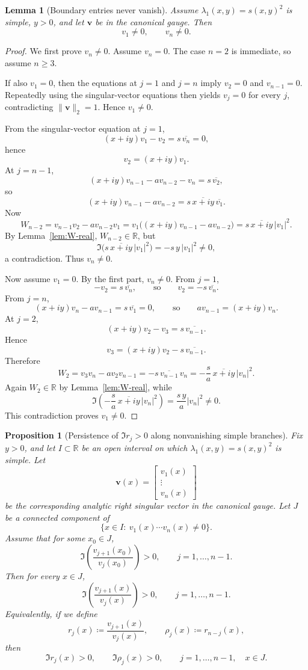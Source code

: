 \documentclass[11pt]{article}
\newtheorem{lemma}[theorem]{Lemma}
\newtheorem{proposition}[theorem]{Proposition}
\begin{document}
\begin{lemma}[Boundary entries never vanish]\label{lem:boundary-entries-nonzero}
Assume \(\lambda_1(x,y)=s(x,y)^2\) is simple, \(y>0\), and let \(\mathbf v\) be in the canonical gauge. Then
\[
v_1\neq 0,
\qquad
v_n\neq 0.
\]
\end{lemma}

\begin{proof}
We first prove \(v_n\neq 0\). Assume \(v_n=0\). The case \(n=2\) is immediate, so assume \(n\ge 3\).

If also \(v_1=0\), then the equations at \(j=1\) and \(j=n\) imply \(v_2=0\) and \(v_{n-1}=0\). Repeatedly using the singular-vector equations then yields \(v_j=0\) for every \(j\), contradicting \(\|\mathbf v\|_2=1\). Hence \(v_1\neq 0\).

From the singular-vector equation at \(j=1\),
\[
(x+iy)v_1-v_2=s\,\overline{v_n}=0,
\]
hence
\[
v_2=(x+iy)v_1.
\]
At \(j=n-1\),
\[
(x+iy)v_{n-1}-a v_{n-2}-v_n=s\,\overline{v_2},
\]
so
\[
(x+iy)v_{n-1}-a v_{n-2}=s\,\overline{x+iy}\,\overline{v_1}.
\]
Now
\[
W_{n-2}=v_{n-1}v_2-a v_{n-2}v_1
=
v_1\bigl((x+iy)v_{n-1}-a v_{n-2}\bigr)
=
s\,\overline{x+iy}\,|v_1|^2.
\]
By Lemma~\ref{lem:W-real}, \(W_{n-2}\in\mathbb R\), but
\[
\Im\!\bigl(s\,\overline{x+iy}\,|v_1|^2\bigr)=-s\,y\,|v_1|^2\neq 0,
\]
a contradiction. Thus \(v_n\neq 0\).

Now assume \(v_1=0\). By the first part, \(v_n\neq 0\). From \(j=1\),
\[
-v_2=s\,\overline{v_n},
\qquad\text{so}\qquad
v_2=-s\,\overline{v_n}.
\]
From \(j=n\),
\[
(x+iy)v_n-a v_{n-1}=s\,\overline{v_1}=0,
\qquad\text{so}\qquad
a v_{n-1}=(x+iy)v_n.
\]
At \(j=2\),
\[
(x+iy)v_2-v_3=s\,\overline{v_{n-1}}.
\]
Hence
\[
v_3=(x+iy)v_2-s\,\overline{v_{n-1}}.
\]
Therefore
\[
W_2=v_3v_n-a v_2v_{n-1}
=
-s\,\overline{v_{n-1}}\,v_n
=
-\frac{s}{a}\,\overline{x+iy}\,|v_n|^2.
\]
Again \(W_2\in\mathbb R\) by Lemma~\ref{lem:W-real}, while
\[
\Im\!\left(-\frac{s}{a}\,\overline{x+iy}\,|v_n|^2\right)
=
\frac{s\,y}{a}|v_n|^2\neq 0.
\]
This contradiction proves \(v_1\neq 0\).
\end{proof}

\begin{proposition}[Persistence of \(\Im r_j>0\) along nonvanishing simple branches]\label{prop:r-positivity-branch}
Fix \(y>0\), and let \(I\subset\mathbb R\) be an open interval on which \(\lambda_1(x,y)=s(x,y)^2\) is simple. Let
\[
\mathbf v(x)=
\begin{bmatrix}
v_1(x)\\
\vdots\\
v_n(x)
\end{bmatrix}
\]
be the corresponding analytic right singular vector in the canonical gauge. Let \(J\) be a connected component of
\[
\{x\in I:\ v_1(x)\cdots v_n(x)\neq 0\}.
\]
Assume that for some \(x_0\in J\),
\[
\Im\!\left(\frac{v_{j+1}(x_0)}{v_j(x_0)}\right)>0,
\qquad
j=1,\dots,n-1.
\]
Then for every \(x\in J\),
\[
\Im\!\left(\frac{v_{j+1}(x)}{v_j(x)}\right)>0,
\qquad
j=1,\dots,n-1.
\]
Equivalently, if we define
\[
r_j(x)\coloneqq \frac{v_{j+1}(x)}{v_j(x)},
\qquad
\rho_j(x)\coloneqq r_{n-j}(x),
\]
then
\[
\Im r_j(x)>0,
\qquad
\Im \rho_j(x)>0,
\qquad
j=1,\dots,n-1,
\quad x\in J.
\]
\end{proposition}
\end{document}
